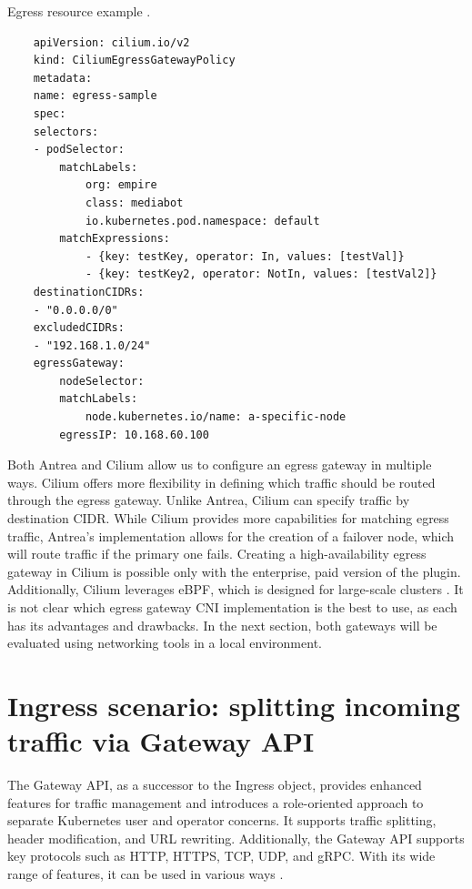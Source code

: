 \begin{listing}[htb]
    \centering
    \caption{Egress resource example \cite{AntreaDocs}.}
    \begin{verbatim}
    apiVersion: cilium.io/v2
    kind: CiliumEgressGatewayPolicy
    metadata:
    name: egress-sample
    spec:
    selectors:
    - podSelector:
        matchLabels:
            org: empire
            class: mediabot
            io.kubernetes.pod.namespace: default
        matchExpressions:
            - {key: testKey, operator: In, values: [testVal]}
            - {key: testKey2, operator: NotIn, values: [testVal2]}
    destinationCIDRs:
    - "0.0.0.0/0"
    excludedCIDRs:
    - "192.168.1.0/24"
    egressGateway:
        nodeSelector:
        matchLabels:
            node.kubernetes.io/name: a-specific-node
        egressIP: 10.168.60.100
    \end{verbatim}
    \label{lst:yamlCiliumEgressGatewayPolicy}
\end{listing}


Both Antrea and Cilium allow us to configure an egress gateway in multiple ways. Cilium offers more flexibility in defining which traffic should be routed through the egress gateway. Unlike Antrea, Cilium can specify traffic by destination CIDR. While Cilium provides more capabilities for matching egress traffic, Antrea's implementation allows for the creation of a failover node, which will route traffic if the primary one fails. Creating a high-availability egress gateway in Cilium is possible only with the enterprise, paid version of the plugin. Additionally, Cilium leverages eBPF, which is designed for large-scale clusters \cite{CiliumDocs}. It is not clear which egress gateway CNI implementation is the best to use, as each has its advantages and drawbacks. In the next section, both gateways will be evaluated using networking tools in a local environment.




\section{Ingress scenario: splitting incoming traffic via Gateway API}
\label{sec:ingress}

The Gateway API, as a successor to the Ingress object, provides enhanced features for traffic management and introduces a role-oriented approach to separate Kubernetes user and operator concerns. It supports traffic splitting, header modification, and URL rewriting. Additionally, the Gateway API supports key protocols such as HTTP, HTTPS, TCP, UDP, and gRPC. With its wide range of features, it can be used in various ways \cite{CiliumUseCases}.

